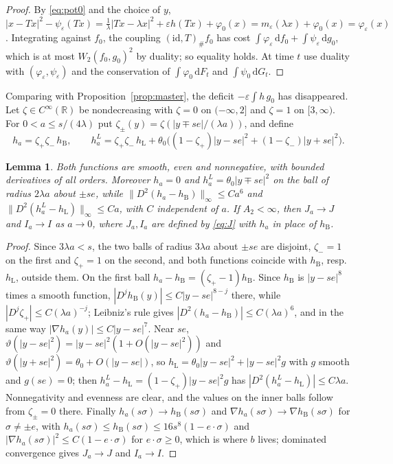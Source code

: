 \documentclass[11pt]{amsart}
\newtheorem{lemma}[theorem]{Lemma}
\theoremstyle{definition}
\newcommand{\RR}{\mathbb{R}}
\newcommand{\dd}{\,\mathrm{d}}
\newcommand{\hB}{h_{\mathrm B}}
\newcommand{\hL}{h_{\mathrm L}}
\begin{document}
\begin{proof}
By \eqref{eq:pot0} and the choice of $y$, $|x-Tx|^2-\psi_\varepsilon(Tx)=\frac1\lambda|Tx-\lambda x|^2+\varepsilon h(Tx)+\varphi_0(x)=m_\varepsilon(\lambda x)+\varphi_0(x)=\varphi_\varepsilon(x)$. Integrating against $f_0$, the coupling $(\mathrm{id},T)_\#f_0$ has cost $\int\varphi_\varepsilon\dd f_0+\int\psi_\varepsilon\dd g_0$, which is at most $W_2(f_0,g_0)^2$ by duality; so equality holds. At time $t$ use duality with $(\varphi_\varepsilon,\psi_\varepsilon)$ and the conservation of $\int\varphi_0\dd F_t$ and $\int\psi_0\dd G_t$.
\end{proof}

Comparing with Proposition~\ref{prop:master}, the deficit $-\varepsilon\int h\,g_0$ has disappeared. Let $\zeta\in C^\infty(\RR)$ be nondecreasing with $\zeta=0$ on $(-\infty,2]$ and $\zeta=1$ on $[3,\infty)$. For $0<a\le s/(4\lambda)$ put $\zeta_\pm(y)=\zeta(|y\mp se|/(\lambda a))$, and define
\begin{equation}\label{eq:flat}
h_a=\zeta_+\zeta_-\,\hB,\qquad h^L_a=\zeta_+\zeta_-\,\hL+\theta_0\big((1-\zeta_+)|y-se|^2+(1-\zeta_-)|y+se|^2\big).
\end{equation}

\begin{lemma}\label{lem:flat}
Both functions are smooth, even and nonnegative, with bounded derivatives of all orders. Moreover $h_a=0$ and $h^L_a=\theta_0|y\mp se|^2$ on the ball of radius $2\lambda a$ about $\pm se$, while $\|D^2(h_a-\hB)\|_\infty\le Ca^6$ and $\|D^2(h^L_a-\hL)\|_\infty\le Ca$, with $C$ independent of $a$. If $A_2<\infty$, then $J_a\to J$ and $I_a\to I$ as $a\to0$, where $J_a,I_a$ are defined by \eqref{eq:J} with $h_a$ in place of $\hB$.
\end{lemma}

\begin{proof}
Since $3\lambda a<s$, the two balls of radius $3\lambda a$ about $\pm se$ are disjoint, $\zeta_-=1$ on the first and $\zeta_+=1$ on the second, and both functions coincide with $\hB$, resp.\ $\hL$, outside them. On the first ball $h_a-\hB=(\zeta_+-1)\hB$. Since $\hB$ is $|y-se|^8$ times a smooth function, $|D^j\hB(y)|\le C|y-se|^{8-j}$ there, while $|D^j\zeta_+|\le C(\lambda a)^{-j}$; Leibniz's rule gives $|D^2(h_a-\hB)|\le C(\lambda a)^6$, and in the same way $|\nabla h_a(y)|\le C|y-se|^7$. Near $se$, $\vartheta(|y-se|^2)=|y-se|^2(1+O(|y-se|^2))$ and $\vartheta(|y+se|^2)=\theta_0+O(|y-se|)$, so $\hL=\theta_0|y-se|^2+|y-se|^2g$ with $g$ smooth and $g(se)=0$; then $h^L_a-\hL=(1-\zeta_+)|y-se|^2g$ has $|D^2(h^L_a-\hL)|\le C\lambda a$. Nonnegativity and evenness are clear, and the values on the inner balls follow from $\zeta_\pm=0$ there. Finally $h_a(s\sigma)\to\hB(s\sigma)$ and $\nabla h_a(s\sigma)\to\nabla\hB(s\sigma)$ for $\sigma\ne\pm e$, with $h_a(s\sigma)\le\hB(s\sigma)\le16s^8(1-e\cdot\sigma)$ and $|\nabla h_a(s\sigma)|^2\le C(1-e\cdot\sigma)$ for $e\cdot\sigma\ge0$, which is where $b$ lives; dominated convergence gives $J_a\to J$ and $I_a\to I$.
\end{proof}
\end{document}
